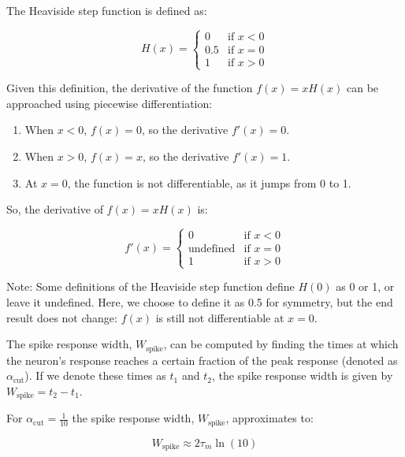 The Heaviside step function is defined as:

\[
H(x) = 
\begin{cases} 
0 & \text{if } x < 0 \\
0.5 & \text{if } x = 0 \\
1 & \text{if } x > 0 
\end{cases}
\]

Given this definition, the derivative of the function \(f(x) = xH(x)\) can be approached using piecewise differentiation:

\begin{enumerate}
\item When \(x < 0\), \(f(x) = 0\), so the derivative \(f'(x) = 0\).

\item When \(x > 0\), \(f(x) = x\), so the derivative \(f'(x) = 1\).

\item At \(x = 0\), the function is not differentiable, as it jumps from 0 to 1.
\end{enumerate}

So, the derivative of \(f(x) = xH(x)\) is:

\[
f'(x) = 
\begin{cases} 
0 & \text{if } x < 0 \\
\text{undefined} & \text{if } x = 0 \\
1 & \text{if } x > 0 
\end{cases}
\]

Note: Some definitions of the Heaviside step function define \(H(0)\) as 0 or 1, or leave it undefined. Here, we choose to define it as 0.5 for symmetry, but the end result does not change: \(f(x)\) is still not differentiable at \(x = 0\).




The spike response width, $W_{\text{{spike}}}$, can be computed by finding the times at which the neuron's response reaches a certain fraction of the peak response (denoted as $\alpha_{\text{{cut}}}$). If we denote these times as $t_1$ and $t_2$, the spike response width is given by $W_{\text{{spike}}} = t_2 - t_1$.

\begin{mdframed}[backgroundcolor=red\_background, linecolor=black, linewidth=2pt, frametitle=\textbf{{Statement}}]
\begin{center}
    \label{st:window-width}
    For $\alpha_{\text{{cut}}} = \frac{1}{10}$ the spike response width, $W_{\text{{spike}}}$, approximates to:

    \begin{equation}
        W_{\text{{spike}}} \approx 2\tau_m \ln(10)
    \end{equation}

\end{center}
\end{mdframed}

